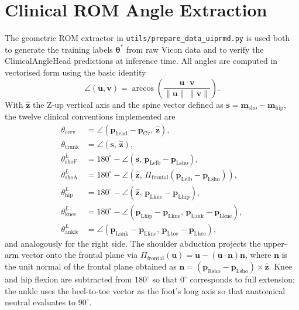 \section{Clinical ROM Angle Extraction}
\label{sec:rom-extraction}

The geometric ROM extractor in
\texttt{utils/prepare\_data\_uiprmd.py} is used both to generate the
training labels $\boldsymbol{\theta}^{*}$ from raw Vicon data and to
verify the ClinicalAngleHead predictions at inference time. All angles
are computed in vectorised form using the basic identity
\begin{equation}
\angle(\mathbf{u},\mathbf{v}) = \arccos\!\left(\frac{\mathbf{u}\cdot\mathbf{v}}
{\lVert\mathbf{u}\rVert\,\lVert\mathbf{v}\rVert}\right).
\label{eq:angle}
\end{equation}
With $\hat{\mathbf{z}}$ the Z-up vertical axis and the spine vector
defined as $\mathbf{s}=\mathbf{m}_{\mathrm{sho}}-\mathbf{m}_{\mathrm{hip}}$,
the twelve clinical conventions implemented are
\begin{align}
\theta_{\mathrm{cerv}}     &= \angle(\mathbf{p}_{\mathrm{head}}-\mathbf{p}_{\mathrm{C7}},\,\hat{\mathbf{z}}), \\
\theta_{\mathrm{trunk}}    &= \angle(\mathbf{s},\,\hat{\mathbf{z}}), \\
\theta^{L}_{\mathrm{shoF}} &= 180^{\circ} - \angle(\mathbf{s},\,\mathbf{p}_{\mathrm{Lelb}}-\mathbf{p}_{\mathrm{Lsho}}), \\
\theta^{L}_{\mathrm{shoA}} &= 180^{\circ} - \angle(\hat{\mathbf{z}},\,\Pi_{\mathrm{frontal}}(\mathbf{p}_{\mathrm{Lelb}}-\mathbf{p}_{\mathrm{Lsho}})), \\
\theta^{L}_{\mathrm{hip}}  &= 180^{\circ} - \angle(\hat{\mathbf{z}},\,\mathbf{p}_{\mathrm{Lkne}}-\mathbf{p}_{\mathrm{Lhip}}), \\
\theta^{L}_{\mathrm{knee}} &= 180^{\circ} - \angle(\mathbf{p}_{\mathrm{Lhip}}-\mathbf{p}_{\mathrm{Lkne}},\,\mathbf{p}_{\mathrm{Lank}}-\mathbf{p}_{\mathrm{Lkne}}), \\
\theta^{L}_{\mathrm{ankle}}&= \angle(\mathbf{p}_{\mathrm{Lank}}-\mathbf{p}_{\mathrm{Lkne}},\,\mathbf{p}_{\mathrm{Ltoe}}-\mathbf{p}_{\mathrm{Lhee}}),
\label{eq:rom-defs}
\end{align}
and analogously for the right side. The shoulder abduction projects
the upper-arm vector onto the frontal plane via
$\Pi_{\mathrm{frontal}}(\mathbf{u})=\mathbf{u}-(\mathbf{u}\!\cdot\!
\mathbf{n})\mathbf{n}$, where $\mathbf{n}$ is the unit normal of the
frontal plane obtained as $\mathbf{n}=(\mathbf{p}_{\mathrm{Rsho}}
-\mathbf{p}_{\mathrm{Lsho}})\times\hat{\mathbf{z}}$. Knee and hip
flexion are subtracted from $180^{\circ}$ so that $0^{\circ}$
corresponds to full extension; the ankle uses the heel-to-toe vector
as the foot's long axis so that anatomical neutral evaluates to
$90^{\circ}$.


